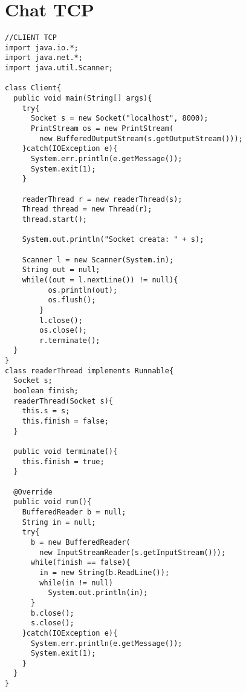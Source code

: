 \documentclass[a4paper, titlepage]{article}
\begin{document}
\newpage

\section{Chat TCP}
	\begin{lstlisting}
//CLIENT TCP
import java.io.*;
import java.net.*;
import java.util.Scanner;

class Client{
  public void main(String[] args){
    try{
      Socket s = new Socket("localhost", 8000);
      PrintStream os = new PrintStream(
        new BufferedOutputStream(s.getOutputStream()));
    }catch(IOException e){
      System.err.println(e.getMessage());
      System.exit(1);
    }
    
    readerThread r = new readerThread(s);
    Thread thread = new Thread(r);
    thread.start();
    
    System.out.println("Socket creata: " + s);
    
    Scanner l = new Scanner(System.in);
    String out = null;
    while((out = l.nextLine()) != null){
    	  os.println(out);
    	  os.flush();
    	}
    	l.close();
    	os.close();
    	r.terminate();
  }
}
class readerThread implements Runnable{
  Socket s;
  boolean finish;
  readerThread(Socket s){
    this.s = s;
    this.finish = false;
  }
  
  public void terminate(){
    this.finish = true;
  }
  
  @Override
  public void run(){
    BufferedReader b = null;
    String in = null;
    try{
      b = new BufferedReader(
        new InputStreamReader(s.getInputStream()));
      while(finish == false){
        in = new String(b.ReadLine());
        while(in != null)
          System.out.println(in);
      }
      b.close();
      s.close();
    }catch(IOException e){
      System.err.println(e.getMessage());
      System.exit(1);
    }
  }
}
	\end{lstlisting}
\newpage
\end{document}
